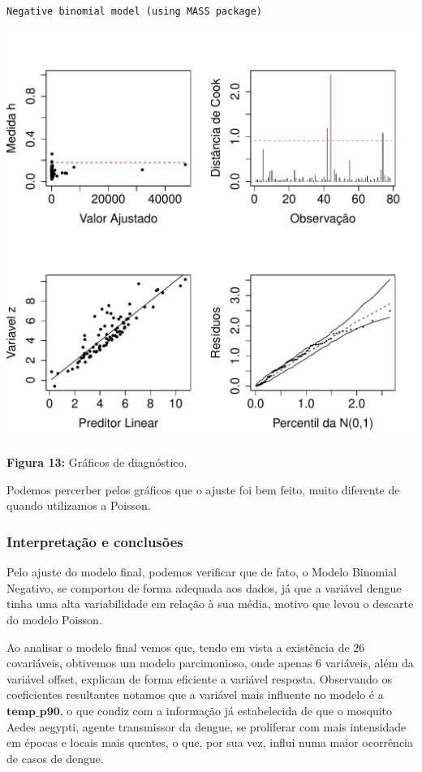 \documentclass[12pt,a4paper]{article}\usepackage[]{graphicx}\usepackage[]{color}
\makeatletter
\def\maxwidth{ %
  \ifdim\Gin@nat@width>\linewidth
    \linewidth
  \else
    \Gin@nat@width
  \fi
}
\newenvironment{kframe}{%
 \def\at@end@of@kframe{}%
 \ifinner\ifhmode%
  \def\at@end@of@kframe{\end{minipage}}%
  \begin{minipage}{\columnwidth}%
 \fi\fi%
 \def\FrameCommand##1{\hskip\@totalleftmargin \hskip-\fboxsep
 \colorbox{shadecolor}{##1}\hskip-\fboxsep
     \hskip-\linewidth \hskip-\@totalleftmargin \hskip\columnwidth}%
 \MakeFramed {\advance\hsize-\width
   \@totalleftmargin\z@ \linewidth\hsize
   \@setminipage}}%
 {\par\unskip\endMakeFramed%
 \at@end@of@kframe}
\newenvironment{knitrout}{}{} %
\makeatother
\begin{document}
\begin{knitrout}
\color{fgcolor}\begin{kframe}
\begin{verbatim}
Negative binomial model (using MASS package) 
\end{verbatim}
\end{kframe}
\includegraphics[width=\maxwidth]{figure/unnamed-chunk-33-1} 

\end{knitrout}
\textbf{Figura 13:} Gráficos de diagnóstico.

Podemos percerber pelos gráficos que o ajuste foi bem feito, muito diferente de quando utilizamos a Poisson.

\subsubsection{\textbf{Interpretação e conclusões}}

Pelo ajuste do modelo final, podemos verificar que de fato, o Modelo Binomial Negativo, se comportou de forma adequada aos dados, já que a variável dengue tinha uma alta variabilidade em relação à sua média, motivo que levou o descarte do modelo Poisson.


Ao analisar o modelo final vemos que, tendo em vista a existência de $26$ covariáveis, obtivemos um modelo parcimonioso, onde apenas $6$ variáveis, além da variável offset, explicam de forma eficiente a variável resposta. Observando os coeficientes resultantes notamos que a variável mais influente no modelo é a $\mathbf{temp\_p90}$, o que condiz com a informação já estabelecida de que o mosquito Aedes aegypti, agente transmissor da dengue, se proliferar com mais intensidade em épocas e locais mais quentes, o que, por sua vez, influi numa maior ocorrência de casos de dengue.
\end{document}
